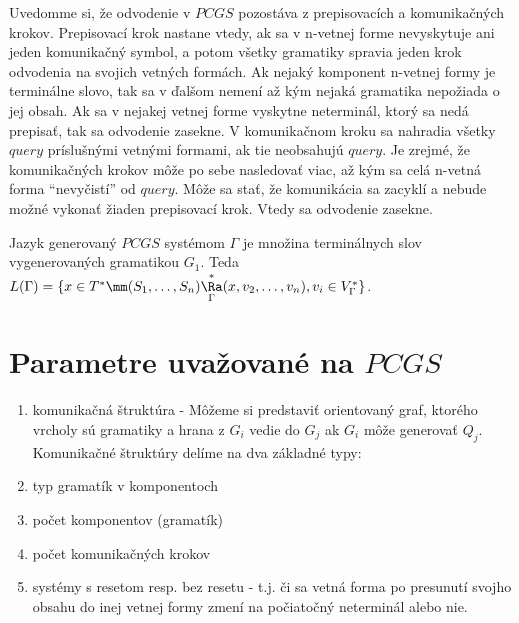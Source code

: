 Uvedomme si, že odvodenie v $PCGS$ pozostáva z prepisovacích a
komunikačných krokov. Pre\-pi\-so\-va\-cí krok nastane vtedy, ak
sa v n-vetnej forme nevyskytuje ani jeden komunikačný symbol, a
potom všetky gramatiky spravia jeden krok odvodenia na svojich
vetných formách. Ak nejaký komponent n-vetnej formy je terminálne
slovo, tak sa v ďalšom nemení až kým nejaká gramatika nepožiada o
jej obsah. Ak sa v nejakej vetnej forme vyskytne neterminál, ktorý
sa nedá prepisať, tak sa odvodenie zasekne. V komunikačnom kroku
sa nahradia všetky $query$ príslušnými vetnými formami, ak tie
neobsahujú $query$. Je zrejmé, že komunikačných krokov môže po
sebe nasledovať viac, až kým sa celá n-vetná forma ``nevyčistí''
od $query$. Môže sa stať, že komunikácia sa zacyklí a nebude možné
vykonať žiaden prepisovací krok. Vtedy sa odvodenie zasekne.

\begin{definicia}
Jazyk generovaný $PCGS$ systémom $\Gamma$ je množina terminálnych
slov vy\-ge\-ne\-ro\-va\-ných gramatikou $G_1$. Teda
$L(\Gamma)=\{x\in T^*\mm (S_1,\dots
,S_n)\overset{*}{\underset{\Gamma}\Ra} (x,v_2,\dots ,v_n),v_i\in
V_\Gamma^*\}$.
\end{definicia}

\section{Parametre uvažované na $PCGS$}

\begin{enumerate}
  \item komunikačná štruktúra - Môžeme si predstaviť orientovaný graf, ktorého
  vrcholy sú gramatiky a hrana z $G_i$ vedie do $G_j$ ak $G_i$ môže
  generovať $Q_j$. Komunikačné štruktúry delíme na dva základné
  typy:
  \item typ gramatík v komponentoch
  \item počet komponentov (gramatík)
  \item počet komunikačných krokov
  \item systémy s resetom resp. bez resetu - t.j. či sa vetná forma
  po presunutí svojho obsahu do inej vetnej formy zmení na
  počiatočný neterminál alebo nie.
\end{enumerate}

